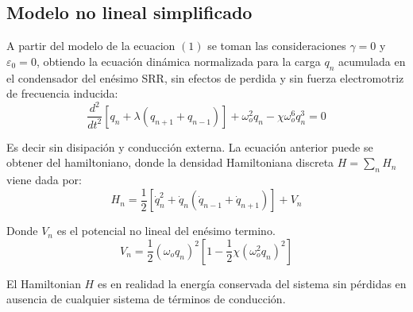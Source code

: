 \documentclass[11pt,letterpaper,twocolumn]{article}
\begin{document}
\subsection*{Modelo no lineal simplificado}
A partir del modelo de la ecuacion $(1)$ se toman las consideraciones $\gamma=0$ y $ \varepsilon_{0}=0$,  obtiendo la ecuación dinámica normalizada para la carga $q_{n}$ acumulada en el condensador del enésimo SRR, sin efectos de perdida y sin fuerza electromotriz de frecuencia inducida:\\
\begin{equation}
\dfrac{d^{2}}{dt^{2}} \left[ q_{n} + \lambda \left( q_{n+1} + q_{n-1}\right) \right] + \omega_{o}^{2} q_{n} - \chi \omega_{o}^{6} q_{n}^{3}=0
\end{equation}
\par 
Es decir sin disipación y conducción externa. La ecuación anterior puede se obtener del hamiltoniano, donde la densidad Hamiltoniana discreta $H= \sum_{n} H_{n}$ viene dada por: 
\begin{equation}
H_{n}= \dfrac{1}{2}\left[ \dot{q}_{n}^{2} + \dot{q}_{n}\left(\dot{q}_{n-1}+\dot{q}_{n+1}\right) \right] + V_{n}
\end{equation}
\par  
Donde $V_{n}$ es el potencial no lineal del enésimo termino.
$$V_{n}=\dfrac{1}{2}\left(\omega_{o} q_{n}\right)^{2} \left[ 1- \dfrac{1}{2}\chi \left(\omega_{o}^{2}q_{n}\right)^{2} \right]$$
\par 
El Hamiltonian $H$ es en realidad la energía conservada del sistema sin pérdidas en ausencia de cualquier sistema de términos de conducción.
\end{document}
